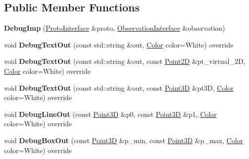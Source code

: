 \subsection*{Public Member Functions}
\begin{DoxyCompactItemize}
\item 
\mbox{\label{classsc2_1_1_debug_imp_abbf3d22de1106ee14cf00f0c54bdb03b}} 
{\bfseries Debug\+Imp} (\hyperlink{classsc2_1_1_proto_interface}{Proto\+Interface} \&proto, \hyperlink{classsc2_1_1_observation_interface}{Observation\+Interface} \&observation)
\item 
\mbox{\label{classsc2_1_1_debug_imp_a810dab628f9b10dc3af1659b0487f755}} 
void {\bfseries Debug\+Text\+Out} (const std\+::string \&out, \hyperlink{structsc2_1_1_color}{Color} color=White) override
\item 
\mbox{\label{classsc2_1_1_debug_imp_afcf93b7cee30d1b0feac1e092f201a3a}} 
void {\bfseries Debug\+Text\+Out} (const std\+::string \&out, const \hyperlink{structsc2_1_1_point2_d}{Point2D} \&pt\+\_\+virtual\+\_\+2D, \hyperlink{structsc2_1_1_color}{Color} color=White) override
\item 
\mbox{\label{classsc2_1_1_debug_imp_a4ae3f7a41b36e4a53dcb57352324ba99}} 
void {\bfseries Debug\+Text\+Out} (const std\+::string \&out, const \hyperlink{structsc2_1_1_point3_d}{Point3D} \&pt3D, \hyperlink{structsc2_1_1_color}{Color} color=White) override
\item 
\mbox{\label{classsc2_1_1_debug_imp_aaba51707ed9f84d627d7ea2a79973a13}} 
void {\bfseries Debug\+Line\+Out} (const \hyperlink{structsc2_1_1_point3_d}{Point3D} \&p0, const \hyperlink{structsc2_1_1_point3_d}{Point3D} \&p1, \hyperlink{structsc2_1_1_color}{Color} color=White) override
\item 
\mbox{\label{classsc2_1_1_debug_imp_adc67d71e587c62082e812736592ed7c1}} 
void {\bfseries Debug\+Box\+Out} (const \hyperlink{structsc2_1_1_point3_d}{Point3D} \&p\+\_\+min, const \hyperlink{structsc2_1_1_point3_d}{Point3D} \&p\+\_\+max, \hyperlink{structsc2_1_1_color}{Color} color=White) override
\item 
\mbox{\label{classsc2_1_1_debug_imp_ac298d140346573f732f70e41039a6142}} 

\end{DoxyCompactItemize}
